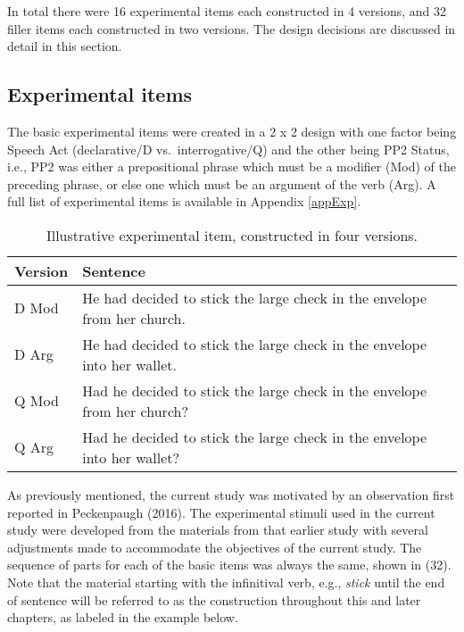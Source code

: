 \documentclass[11pt,oneside]{book}
\begin{document}
In total there were 16 experimental items each constructed in 4 versions, and 32 filler items each constructed in two versions. The design decisions are discussed in detail in this section.

\hypertarget{exps}{%
\subsection{Experimental items}\label{exps}}

The basic experimental items were created in a 2 x 2 design with one factor being Speech Act (declarative/D vs.~interrogative/Q) and the other being PP2 Status, i.e., PP2 was either a prepositional phrase which must be a modifier (Mod) of the preceding phrase, or else one which must be an argument of the verb (Arg). A full list of experimental items is available in Appendix \ref{appExp}.

\begin{table}[H]

\caption{\label{tab:sentences}Illustrative experimental item, constructed in four versions.}
\centering
\begin{tabular}{ll}
\toprule
Version & Sentence\\
\midrule
D Mod & He had decided to stick the large check in the envelope from her church.\\
D Arg & He had decided to stick the large check in the envelope into her wallet.\\
Q Mod & Had he decided to stick the large check in the envelope from her church?\\
Q Arg & Had he decided to stick the large check in the envelope into her wallet?\\
\bottomrule
\end{tabular}
\end{table}

As previously mentioned, the current study was motivated by an observation first reported in Peckenpaugh (2016). The experimental stimuli used in the current study were developed from the materials from that earlier study with several adjustments made to accommodate the objectives of the current study. The sequence of parts for each of the basic items was always the same, shown in (32). Note that the material starting with the infinitival verb, e.g., \emph{stick} until the end of sentence will be referred to as the construction throughout this and later chapters, as labeled in the example below.

\singlespacing
\end{document}
